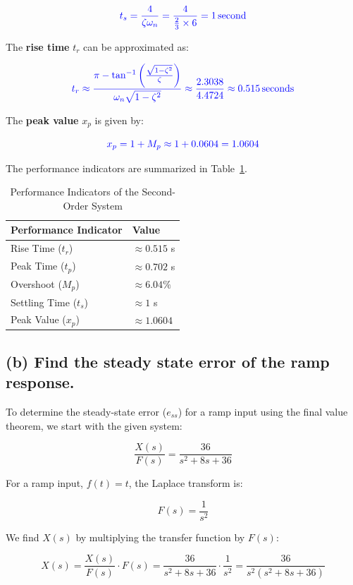 \documentclass[12pt]{article}
\begin{document}
\[
	\textcolor{blue}{t_s = \frac{4}{\zeta \omega_n} = \frac{4}{\frac{2}{3} \times 6} = 1 \, \text{second}}
\]

The \textbf{rise time} \( t_r \) can be approximated as:

\[
	\textcolor{blue}{t_r \approx \frac{\pi - \tan^{-1} \left( \frac{\sqrt{1 - \zeta^2}}{\zeta} \right)}{\omega_n \sqrt{1 - \zeta^2}} \approx \frac{2.3038}{4.4724} \approx 0.515 \, \text{seconds}}
\]

The \textbf{peak value} \( x_p \) is given by:

\[
	\textcolor{blue}{x_p = 1 + M_p \approx 1 + 0.0604 = 1.0604}
\]

The performance indicators are summarized in Table~\ref{tab:performance_indicators}.
\begin{table}[h!]
	\centering
	\begin{tabular}{@{}ll@{}}
		\toprule
		\textbf{Performance Indicator} & \textbf{Value}    \\ \midrule
		Rise Time (\( t_r \))          & $\approx 0.515$ s \\
		Peak Time (\( t_p \))          & $\approx 0.702$ s \\
		Overshoot (\( M_p \))          & $\approx 6.04\%$  \\
		Settling Time (\( t_s \))      & $\approx 1$ s     \\
		Peak Value (\( x_p \))         & $\approx 1.0604$  \\ \bottomrule
	\end{tabular}
	\caption{Performance Indicators of the Second-Order System}
	\label{tab:performance_indicators}
\end{table}

\newpage
\subsection*{(b) Find the steady state error of the ramp response.}
To determine the steady-state error (\( e_{ss} \)) for a ramp input using the final value theorem, we start with the given system:

\[
	\frac{X(s)}{F(s)} = \frac{36}{s^2 + 8s + 36}
\]

For a ramp input, \( f(t) = t \), the Laplace transform is:

\[
	F(s) = \frac{1}{s^2}
\]

We find \( X(s) \) by multiplying the transfer function by \( F(s) \):

\[
	X(s) = \frac{X(s)}{F(s)} \cdot F(s) = \frac{36}{s^2 + 8s + 36} \cdot \frac{1}{s^2} = \frac{36}{s^2 (s^2 + 8s + 36)}
\]
\end{document}
